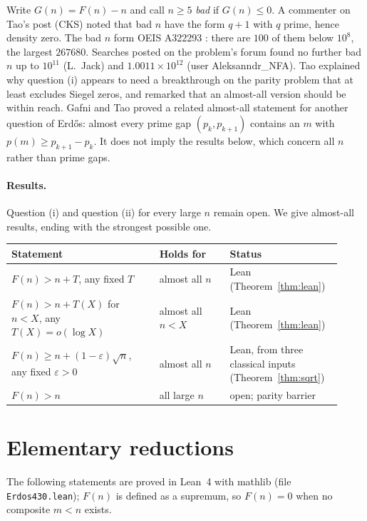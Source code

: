 \documentclass[11pt,letterpaper]{article}
\theoremstyle{remark}
\begin{document}
Write $G(n)=F(n)-n$ and call $n\ge 5$ \emph{bad} if $G(n)\le 0$. A commenter
on Tao's post \cite{tao} (CKS) noted that bad $n$ have the form $q+1$ with $q$
prime, hence density zero. The bad $n$ form OEIS A322293 \cite{oeis}: there are
$100$ of them below $10^8$, the largest $267680$. Searches posted on the
problem's forum \cite{bloom} found no further bad $n$ up to $10^{11}$
(L.~Jack) and $1.0011\times10^{12}$ (user Aleksanndr\_NFA). Tao \cite{tao}
explained why question (i) appears to need a breakthrough on the parity
problem that at least excludes Siegel zeros, and remarked that an almost-all
version should be within reach. Gafni and Tao \cite{gafnitao} proved a related
almost-all statement for another question of Erd\H{o}s: almost every prime gap
$(p_k,p_{k+1})$ contains an $m$ with $p(m)\ge p_{k+1}-p_k$. It does not imply the
results below, which concern all $n$ rather than prime gaps.

\paragraph{Results.} Question (i) and question (ii) for every large $n$ remain
open. We give almost-all results, ending with the strongest possible one.

\begin{center}
\small
\begin{tabular}{p{0.42\linewidth}p{0.2\linewidth}p{0.3\linewidth}}
\toprule
Statement & Holds for & Status \\
\midrule
$F(n)>n+T$, any fixed $T$ & almost all $n$ & Lean (Theorem~\ref{thm:lean}) \\
$F(n)>n+T(X)$ for $n<X$, any $T(X)=o(\log X)$ & almost all $n<X$ & Lean (Theorem~\ref{thm:lean}) \\
$F(n)\ge n+(1-\varepsilon)\sqrt n$, any fixed $\varepsilon>0$ & almost all $n$ & Lean, from three classical inputs (Theorem~\ref{thm:sqrt}) \\
$F(n)>n$ & all large $n$ & open; parity barrier \\
\bottomrule
\end{tabular}
\end{center}

\section{Elementary reductions}

The following statements are proved in Lean~4 with mathlib (file
\texttt{Erdos430.lean}); $F(n)$ is defined as a supremum, so $F(n)=0$ when no
composite $m<n$ exists.
\end{document}

